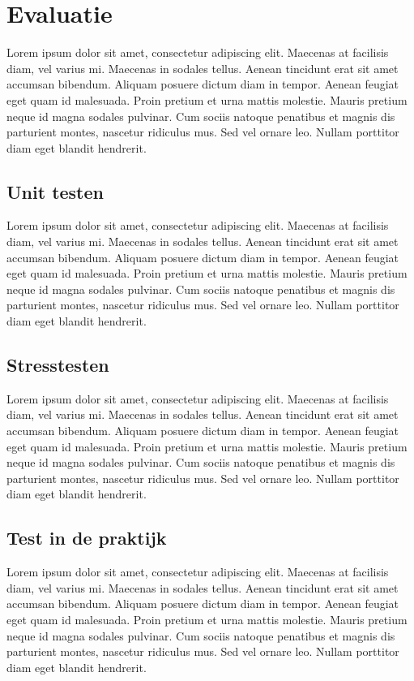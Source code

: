 \chapter{Evaluatie}

Lorem ipsum dolor sit amet, consectetur adipiscing elit. Maecenas at facilisis diam, vel varius mi. Maecenas in sodales tellus. Aenean tincidunt erat sit amet accumsan bibendum. Aliquam posuere dictum diam in tempor. Aenean feugiat eget quam id malesuada. Proin pretium et urna mattis molestie. Mauris pretium neque id magna sodales pulvinar. Cum sociis natoque penatibus et magnis dis parturient montes, nascetur ridiculus mus. Sed vel ornare leo. Nullam porttitor diam eget blandit hendrerit.


\section{Unit testen}

Lorem ipsum dolor sit amet, consectetur adipiscing elit. Maecenas at facilisis diam, vel varius mi. Maecenas in sodales tellus. Aenean tincidunt erat sit amet accumsan bibendum. Aliquam posuere dictum diam in tempor. Aenean feugiat eget quam id malesuada. Proin pretium et urna mattis molestie. Mauris pretium neque id magna sodales pulvinar. Cum sociis natoque penatibus et magnis dis parturient montes, nascetur ridiculus mus. Sed vel ornare leo. Nullam porttitor diam eget blandit hendrerit.


\section{Stresstesten}

Lorem ipsum dolor sit amet, consectetur adipiscing elit. Maecenas at facilisis diam, vel varius mi. Maecenas in sodales tellus. Aenean tincidunt erat sit amet accumsan bibendum. Aliquam posuere dictum diam in tempor. Aenean feugiat eget quam id malesuada. Proin pretium et urna mattis molestie. Mauris pretium neque id magna sodales pulvinar. Cum sociis natoque penatibus et magnis dis parturient montes, nascetur ridiculus mus. Sed vel ornare leo. Nullam porttitor diam eget blandit hendrerit.


\section{Test in de praktijk}

Lorem ipsum dolor sit amet, consectetur adipiscing elit. Maecenas at facilisis diam, vel varius mi. Maecenas in sodales tellus. Aenean tincidunt erat sit amet accumsan bibendum. Aliquam posuere dictum diam in tempor. Aenean feugiat eget quam id malesuada. Proin pretium et urna mattis molestie. Mauris pretium neque id magna sodales pulvinar. Cum sociis natoque penatibus et magnis dis parturient montes, nascetur ridiculus mus. Sed vel ornare leo. Nullam porttitor diam eget blandit hendrerit.


